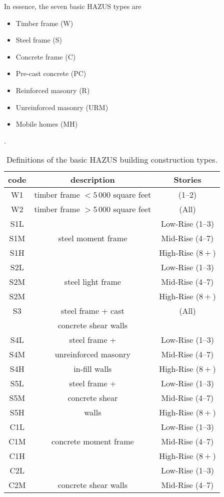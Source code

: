 In essence, the seven basic HAZUS types are
\begin{itemize}
\item Timber frame (W) \item Steel frame (S) \item Concrete frame
(C) \item Pre-cast concrete (PC) \item Reinforced masonry (R)
\item Unreinforced masonry (URM) \item Mobile homes (MH)
\end{itemize}
\begin{table}
 \caption{Definitions of the basic HAZUS building
construction types.} \vspace{0.8em} \label{tab:hazus-types}.
\centering
\begin{tabular}{|c|c|c|}
\hline
code & description & Stories\\
\hline
W1 & timber frame $<5\,000$ square feet & (1--2)\\
W2 & timber frame $> 5\,000$ square feet & (All)\\
\hline S1L &   & Low-Rise (1--3) \\
S1M & steel moment frame & Mid-Rise (4--7)\\
S1H & & High-Rise ($8+$)\\
\hline
S2L & & Low-Rise (1--3)\\
S2M & steel light frame & Mid-Rise (4--7)\\
S2M &  & High-Rise ($8+$)\\
\hline
S3 & steel frame + cast &  (All)\\
  & concrete shear walls  & \\
\hline
S4L & steel frame + & Low-Rise (1--3)\\
S4M & unreinforced masonry  & Mid-Rise (4--7)\\
S4H & in-fill walls& High-Rise ($8+$)\\
\hline
S5L & steel frame + & Low-Rise (1--3)\\
S5M & concrete shear & Mid-Rise (4--7)\\
S5H & walls  & High-Rise ($8+$)\\
\hline
C1L & & Low-Rise (1--3)\\
C1M &  concrete moment frame & Mid-Rise (4--7)\\
C1H & & High-Rise ($8+$)\\
\hline
C2L & & Low-Rise (1--3)\\
C2M & concrete shear walls  & Mid-Rise (4--7)\\

\end{tabular}
\end{table}

